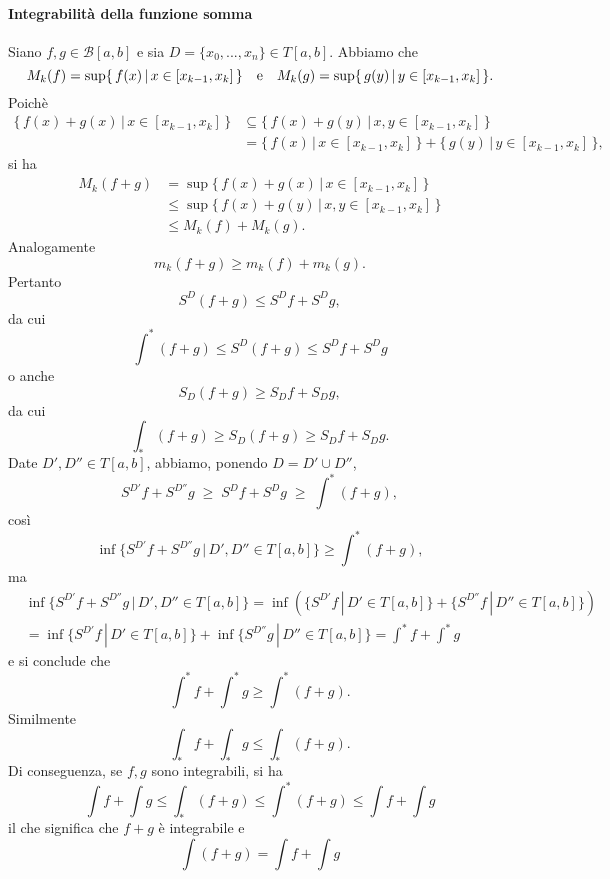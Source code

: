 \documentclass{article}
\theoremstyle{plain}
\theoremstyle{definition}
\theoremstyle{remark}
\begin{document}
\vspace{10pt}

\paragraph{Integrabilità della funzione somma}
Siano $f,g\in\mathcal{B}[a,b]$ e sia $D=\{x_0,...,x_n\}\in T[a,b]$.
Abbiamo che
\[M_k(f) = \sup\{\,f(x)\,|\,x\in[x_{k-1},x_k]\,\}\quad\textup{e}\quad M_k(g) = \sup\{\,g(y)\,|\,y\in[x_{k-1},x_k]\,\}.\]
Poichè 
\begin{align*}
    \{\,f(x)+g(x)\,|\,x\in[x_{k-1},x_k]\,\}&\subseteq \{\,f(x)+g(y)\,|\,x,y\in[x_{k-1},x_k]\,\}\\
    &=\{\,f(x)\,|\,x\in[x_{k-1},x_k]\,\}+\{\,g(y)\,|\,y\in[x_{k-1},x_k]\,\},
\end{align*}
si ha 
\begin{align*}
    M_k(f+g)&=\sup\{\,f(x)+g(x)\,|\,x\in[x_{k-1},x_k]\,\}\\
    &\leq\sup\{\,f(x)+g(y)\,|\,x,y\in[x_{k-1},x_k]\,\}\\
    &\leq M_k(f)+M_k(g).
\end{align*}
Analogamente \[m_k(f+g)\geq m_k(f)+m_k(g).\]
Pertanto \[S^D(f+g)\leq S^Df+S^Dg,\] da cui \[\int^{*}(f+g)\leq S^D(f+g)\leq S^Df+S^Dg\]
o anche \[S_D(f+g)\geq S_Df+S_Dg,\] da cui \[\int_{*}(f+g)\geq S_D(f+g)\geq S_Df+ S_Dg.\]
Date $D',D''\in T[a,b]$, abbiamo, ponendo $D=D'\cup D''$, 
\[S^{D'}f+S^{D''}g\;\geq\; S^Df+S^Dg\;\geq\; \int^*(f+g),\] 
così \[\inf\{S^{D'}f+S^{D''}g\,|\,D',D''\in T[a,b]\}\geq\int^*(f+g),\]
ma 
\begin{align*}
    &\inf\{S^{D'}f+S^{D''}g\,|\,D',D''\in T[a,b]\}=\inf(\{S^{D'}f\,|\,D'\in T[a,b]\}+\{S^{D''}f\,|\,D''\in T[a,b]\})\\
    &=\inf\{S^{D'}f\,|\,D'\in T[a,b]\}+\inf\{S^{D''}g\,|\,D''\in T[a,b]\}=\int^*f+\int^*g
\end{align*}
e si conclude che \[\int^*f+\int^*g\geq\int^*(f+g).\]
Similmente \[\int_*f+\int_*g\leq\int_*(f+g).\]
Di conseguenza, se $f,g$ sono integrabili, si ha \[\int f+\int g\leq \int_*(f+g)\leq\int^*(f+g)\leq\int f+\int g\]
il che significa che $f+g$ è integrabile e \[\int(f+g)=\int f+ \int g\]

\vspace{10pt}
\end{document}
